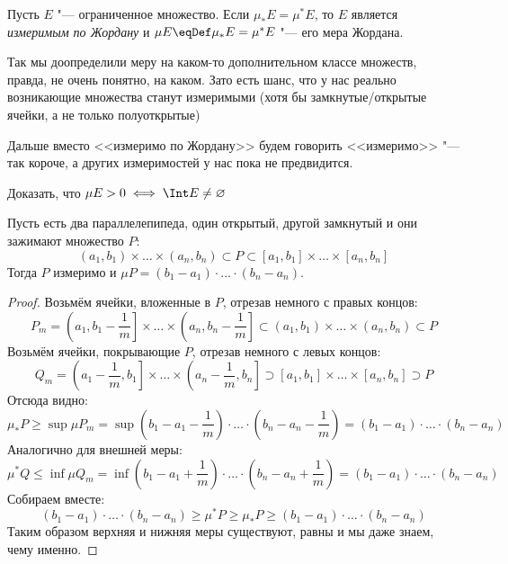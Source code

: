 \begin{Def}
	Пусть $E$ "--- ограниченное множество.
	Если $\mu_* E = \mu^* E$, то $E$ является \textit{измеримым по Жордану}
	и $\mu E \eqDef \mu_* E = \mu^* E$ "--- его мера Жордана.
\end{Def}
\begin{Rem}
	Так мы доопределили меру на каком-то дополнительном классе множеств, правда, не очень понятно, на каком.
	Зато есть шанс, что у нас реально возникающие множества станут измеримыми
	(хотя бы замкнутые/открытые ячейки,	а не только полуоткрытые)
\end{Rem}
\begin{Rem}
	Дальше вместо <<измеримо по Жордану>> будем говорить <<измеримо>> "--- так короче, а других измеримостей у нас пока не предвидится.
\end{Rem}
\begin{Exercise}
	Доказать, что $\mu E > 0 \iff \Int E \neq \varnothing$
\end{Exercise}
\begin{exmp}
	Пусть есть два параллелепипеда, один открытый, другой замкнутый и они зажимают множество $P$:
	\[ (a_1, b_1) \times \dots \times (a_n, b_n) \subset P \subset [a_1, b_1] \times \dots \times [a_n, b_n] \]
	Тогда $P$ измеримо и $\mu P = (b_1-a_1) \cdot \dots \cdot (b_n - a_n)$.
\end{exmp}
\begin{proof}
	Возьмём ячейки, вложенные в $P$, отрезав немного с правых концов:
	\[P_m = \left(a_1, b_1 - \frac 1m\right] \times \dots \times \left(a_n, b_n - \frac 1m\right] \subset \left(a_1, b_1\right) \times \dots \times \left(a_n, b_n\right) \subset P\]
	Возьмём ячейки, покрывающие $P$, отрезав немного с левых концов:
	\[Q_m = \left(a_1 - \frac 1m, b_1\right] \times \dots \times \left(a_n - \frac 1m, b_n\right] \supset \left[a_1, b_1\right] \times \dots \times \left[a_n, b_n\right] \supset P\]
	Отсюда видно:
	\[
	\mu_* P \ge \sup \mu P_m = \sup \left(b_1 - a_1 - \frac 1m\right) \cdot \dots \cdot \left(b_n - a_n - \frac 1m\right) = \left(b_1-a_1\right)\cdot\dots\cdot\left(b_n-a_n\right)
	\]
	Аналогично для внешней меры:
	\[
	\mu^* Q \le \inf \mu Q_m = \inf \left(b_1 - a_1 + \frac 1m\right) \cdot \dots \cdot \left(b_n - a_n + \frac 1m\right) = \left(b_1-a_1\right)\cdot\dots\cdot\left(b_n-a_n\right)
	\]
	Собираем вместе:
	\[
	\left(b_1-a_1\right)\cdot\dots\cdot\left(b_n-a_n\right) \ge \mu^* P \ge \mu_* P \ge \left(b_1-a_1\right)\cdot\dots\cdot\left(b_n-a_n\right)
	\]
	Таким образом верхняя и нижняя меры существуют, равны и мы даже знаем, чему именно.
\end{proof}

